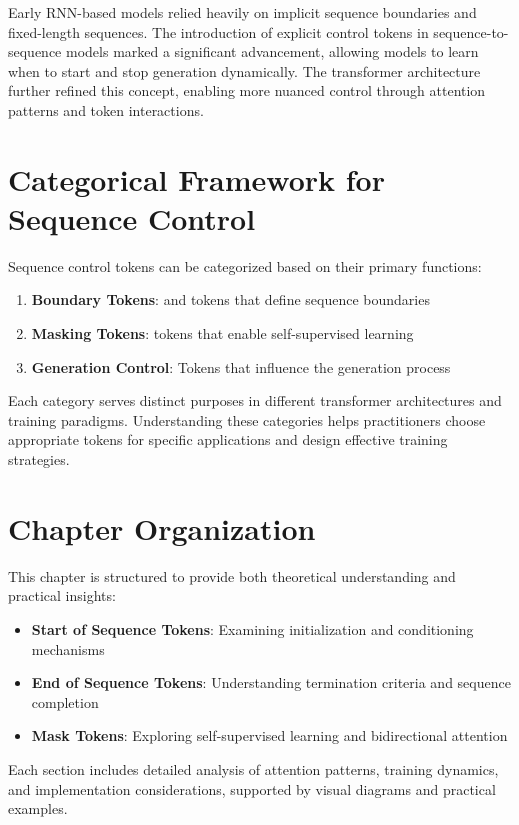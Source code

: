 Early RNN-based models relied heavily on implicit sequence boundaries and fixed-length sequences. The introduction of explicit control tokens in sequence-to-sequence models marked a significant advancement, allowing models to learn when to start and stop generation dynamically. The transformer architecture further refined this concept, enabling more nuanced control through attention patterns and token interactions.
\begin{comment}
Feedback: This is a good historical overview. To make the "transformer" advantage more concrete, you could add a sentence explaining *how* attention made a difference. For example: "Unlike RNNs, where the influence of a start token could fade over long sequences, the transformer's attention mechanism allows control tokens like [SOS] and [EOS] to directly influence every other token in the sequence, regardless of distance, leading to more robust and precise control."
\end{comment}

\section{Categorical Framework for Sequence Control}

Sequence control tokens can be categorized based on their primary functions:

\begin{enumerate}
\item \textbf{Boundary Tokens}: \sos{} and \eos{} tokens that define sequence boundaries
\item \textbf{Masking Tokens}: \mask{} tokens that enable self-supervised learning
\item \textbf{Generation Control}: Tokens that influence the generation process
\end{enumerate}

Each category serves distinct purposes in different transformer architectures and training paradigms. Understanding these categories helps practitioners choose appropriate tokens for specific applications and design effective training strategies.

\section{Chapter Organization}

This chapter is structured to provide both theoretical understanding and practical insights:

\begin{itemize}
\item \textbf{Start of Sequence Tokens}: Examining initialization and conditioning mechanisms
\item \textbf{End of Sequence Tokens}: Understanding termination criteria and sequence completion
\item \textbf{Mask Tokens}: Exploring self-supervised learning and bidirectional attention
\end{itemize}

Each section includes detailed analysis of attention patterns, training dynamics, and implementation considerations, supported by visual diagrams and practical examples.
